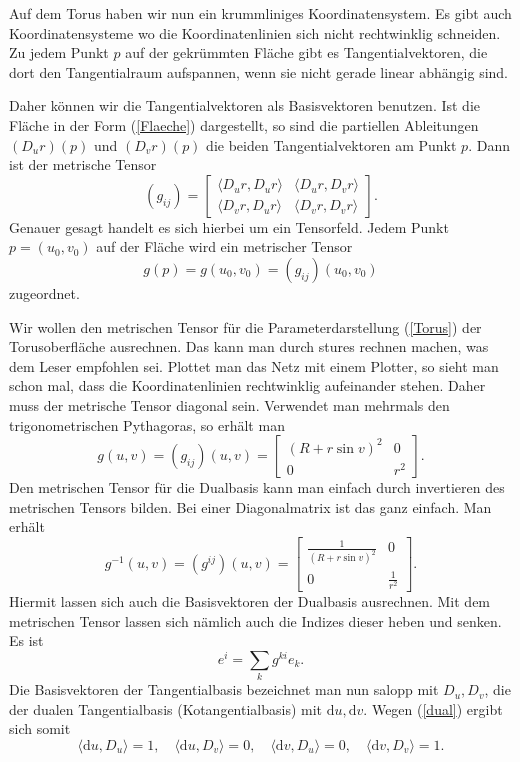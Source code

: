 \documentclass[a4paper,12pt,fleqn,dvipdfmx]{article}
\begin{document}
Auf dem Torus haben wir nun ein krummliniges Koordinatensystem.
Es gibt auch Koordinatensysteme wo die Koordinatenlinien sich
nicht rechtwinklig schneiden. Zu jedem Punkt $p$ auf der gekrümmten
Fläche gibt es Tangentialvektoren, die dort den Tangentialraum
aufspannen, wenn sie nicht gerade linear abhängig sind.

Daher können wir die Tangentialvektoren als Basisvektoren benutzen.
Ist die Fläche in der Form (\ref{Flaeche}) dargestellt, so sind
die partiellen Ableitungen $(D_u r)(p)$ und $(D_v r)(p)$ die
beiden Tangentialvektoren am Punkt $p$. Dann ist der metrische Tensor
\begin{equation}
(g_{ij}) = \begin{bmatrix}
\langle D_u r,D_u r\rangle & \langle D_u r, D_v r\rangle\\
\langle D_v r,D_u r\rangle & \langle D_v r, D_v r\rangle
\end{bmatrix}.
\end{equation}
Genauer gesagt handelt es sich hierbei um ein Tensorfeld. Jedem
Punkt $p=(u_0,v_0)$ auf der Fläche wird ein metrischer Tensor
\begin{equation}
g(p) = g(u_0,v_0) = (g_{ij})(u_0,v_0)
\end{equation}
zugeordnet.

Wir wollen den metrischen Tensor für die Parameterdarstellung
(\ref{Torus}) der Torusoberfläche ausrechnen. Das kann man
durch stures rechnen
machen, was dem Leser empfohlen sei. Plottet man das Netz mit
einem Plotter, so sieht man schon mal, dass die Koordinatenlinien
rechtwinklig aufeinander stehen. Daher muss der metrische Tensor
diagonal sein. Verwendet man mehrmals den trigonometrischen
Pythagoras, so erhält man
\begin{equation}
g(u,v) = (g_{ij})(u,v)= \begin{bmatrix}
(R+r\sin v)^2 & 0\\
0 & r^2
\end{bmatrix}.
\end{equation}
Den metrischen Tensor für die Dualbasis kann man einfach durch
invertieren des metrischen Tensors bilden. Bei einer Diagonalmatrix
ist das ganz einfach. Man erhält
\begin{equation}
g^{-1}(u,v) = (g^{ij})(u,v)= \begin{bmatrix}
\frac{1}{(R+r\sin v)^2} & 0\\
0 & \frac{1}{r^2}
\end{bmatrix}.
\end{equation}
Hiermit lassen sich auch die Basisvektoren der Dualbasis ausrechnen.
Mit dem metrischen Tensor lassen sich nämlich auch die Indizes
dieser heben und senken. Es ist
\begin{equation}\label{Bvheben}
e^i = \sum_{k} g^{ki}e_k.
\end{equation}
Die Basisvektoren der Tangentialbasis bezeichnet man nun salopp
mit $D_u,D_v$, die der dualen Tangentialbasis (Kotangentialbasis)
mit $\mathrm du,\mathrm dv$. Wegen (\ref{dual}) ergibt sich
somit
\begin{equation}\label{Tdual}
\langle\mathrm du,D_u\rangle=1,\quad
\langle\mathrm du,D_v\rangle=0,\quad
\langle\mathrm dv,D_u\rangle=0,\quad
\langle\mathrm dv,D_v\rangle=1.
\end{equation}
\end{document}
